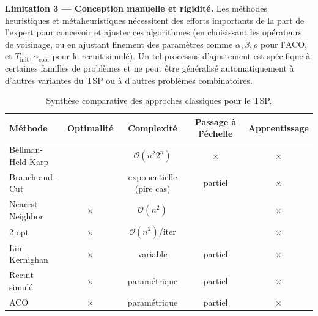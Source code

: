 \documentclass[12pt, a4paper, twoside, openright]{book}
\begin{document}
\textbf{Limitation 3 --- Conception manuelle et rigidité.}
Les méthodes heuristiques et métaheuristiques nécessitent des efforts importants de la part de l'expert pour concevoir et ajuster ces algorithmes (en choisissant les opérateurs de voisinage, ou en ajustant finement des paramètres comme $\alpha, \beta, \rho$ pour l'ACO, et $T_{\text{init}}, \alpha_{\text{cool}}$ pour le recuit simulé). Un tel processus d'ajustement est spécifique à certaines familles de problèmes et ne peut être généralisé automatiquement à d'autres variantes du TSP ou à d'autres problèmes combinatoires.
	
	\begin{table}[H]
		\centering
		\caption{Synthèse comparative des approches classiques pour le TSP.}
		\label{tab:synthese_classiques}
		\small
		\begin{tabular}{lcccc}
			\toprule
			\textbf{Méthode} & \textbf{Optimalité} & \textbf{Complexité}
			& \textbf{Passage à l'échelle} & \textbf{Apprentissage} \\
			\midrule
			Bellman-Held-Karp  & \checkmark & $\mathcal{O}(n^2 2^n)$      & $\times$   & $\times$ \\
			Branch-and-Cut     & \checkmark & exponentielle (pire cas)     & partiel    & $\times$ \\
			Nearest Neighbor   & $\times$   & $\mathcal{O}(n^2)$           & \checkmark & $\times$ \\
			2-opt              & $\times$   & $\mathcal{O}(n^2)$/iter      & \checkmark & $\times$ \\
			Lin-Kernighan      & $\times$   & variable & partiel    & $\times$ \\
			Recuit simulé      & $\times$   & paramétrique                 & partiel    & $\times$ \\
			ACO                & $\times$   & paramétrique                 & partiel    & $\times$ \\
			\bottomrule
		\end{tabular}
	\end{table}
	
\end{document}

